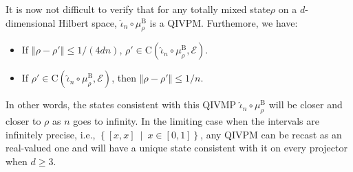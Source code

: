 \documentclass[english,reprint, aps, prl,superscriptaddress, showpacs,
showkeys, longbibliography, amsmath, amssymb]{revtex4-1}
\theoremstyle{plain}
\theoremstyle{definition}
\newcommand{\events}{\ensuremath{\mathcal{E}}}
\newcommand{\set}[2]{\ensuremath{\left\{ {#1}~\middle|~{#2}\right\} }}
\newcommand{\coreBorn}{\ensuremath{\mathrm{C}}}
\newcommand{\nb}{\nolinebreak[1] }
\begin{document}
It is now not difficult to verify that for any totally mixed
state\nb$\rho$ on a $d$-dimensional Hilbert space,
$\widehat{\iota}_{n}\circ\mu_{\rho}^{\mathrm{B}}$ is a
QIVPM. Furthemore, we have:
\begin{itemize}
\item If $\left\Vert \rho-\rho'\right\Vert \le1/\left(4dn\right)$, $\rho'\in\coreBorn\left(\widehat{\iota}_{n}\circ\mu_{\rho}^{\mathrm{B}},\events\right)$.
\item If $\rho'\in\coreBorn\left(\widehat{\iota}_{n}\circ\mu_{\rho}^{\mathrm{B}},\events\right)$,
then $\left\Vert \rho-\rho'\right\Vert \le1/n$.
\end{itemize}
In other words, the states consistent with this QIVMP
$\widehat{\iota}_{n}\circ\mu_{\rho}^{\mathrm{B}}$ will be closer and
closer to $\rho$ as $n$ goes to infinity. In the limiting case when
the intervals are infinitely precise, i.e.,
$\set{\left[x,x\right]}{x\in\left[0,1\right]}$, any QIVPM can be
recast as an real-valued one and will have a unique state consistent
with it on every projector when $d\ge3$.



\end{document}
